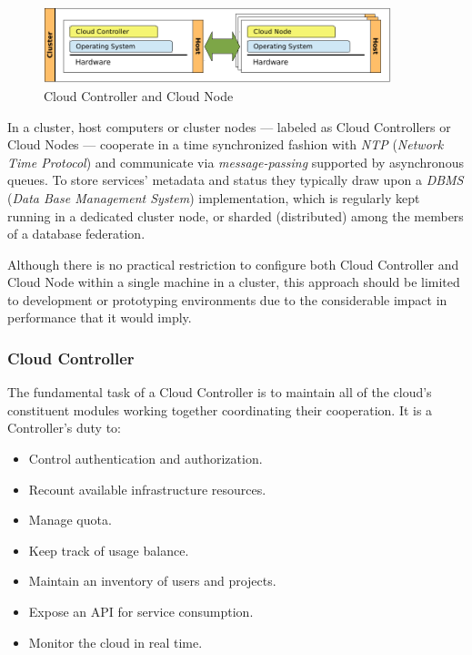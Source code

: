 \begin{figure}[tbp]
\begin{center}
\includegraphics[width=0.9\textwidth]{imagenes/004.pdf}
 \caption{Cloud Controller and Cloud Node}
\label{fig:archcloud}
\end{center}
\end{figure}

In a cluster, host computers or cluster nodes --- labeled as Cloud Controllers or Cloud Nodes --- cooperate in a time synchronized fashion with \emph{NTP} (\emph{Network Time Protocol}) and communicate via \emph{message-passing} supported by asynchronous queues. To store services' metadata and status they typically draw upon a \emph{DBMS} (\emph{Data Base Management System}) implementation, which is regularly kept running in a dedicated cluster node, or sharded (distributed) among the members of a database federation.

Although there is no practical restriction to configure both Cloud Controller and Cloud Node within a single machine in a cluster, this approach should be limited to development or prototyping environments due to the considerable impact in performance that it would imply.

\subsubsection{Cloud Controller}\label{subsubsec:cloudcontroller}
\noindent The fundamental task of a Cloud Controller is to maintain all of the cloud's constituent modules working together coordinating their cooperation. It is a Controller's duty to:

\begin{itemize}
 \item Control authentication and authorization.
 \item Recount available infrastructure resources.
 \item Manage quota.
 \item Keep track of usage balance.
 \item Maintain an inventory of users and projects.
 \item Expose an API for service consumption.
 \item Monitor the cloud in real time.
\end{itemize}

